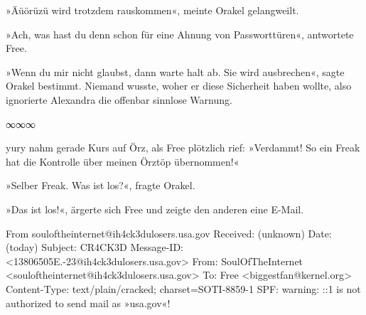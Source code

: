 »Äüörüzü wird trotzdem rauskommen«, meinte Orakel gelangweilt.

»Ach, was hast du denn schon für eine Ahnung von Passworttüren«, antwortete Free.

»Wenn du mir nicht glaubst, dann warte halt ab. Sie wird ausbrechen«, sagte Orakel bestimmt. Niemand wusste, woher er diese Sicherheit haben wollte, also ignorierte Alexandra die offenbar sinnlose Warnung.

\begin{center}
    ∞∞∞
\end{center}

yury nahm gerade Kurs auf Örz, als Free plötzlich rief: »Verdammt! So ein Freak hat die Kontrolle über meinen Örztöp übernommen!«

»Selber Freak. Was ist los?«, fragte Orakel.

»Das ist los!«, ärgerte sich Free und zeigte den anderen eine E-Mail.

\newpage

\noindent \parbox{\textwidth}{

    \begin{footnotesize}
    \begin{ttfamily}

From souloftheinternet@ih4ck3dulosers.usa.gov
Received: (unknown)
Date: (today)
Subject: CR4CK3D
Message-ID: <13806505E.-23@ih4ck3dulosers.usa.gov>
From: SoulOfTheInternet <souloftheinternet@ih4ck3dulosers.usa.gov>
To: Free <biggestfan@kernel.org>
Content-Type: text/plain/cracked; charset=SOTI-8859-1
SPF: warning: ::1 is not authorized to send mail as »usa.gov«!

    \end{ttfamily}
    \end{footnotesize}

\vspace{3ex} } %

